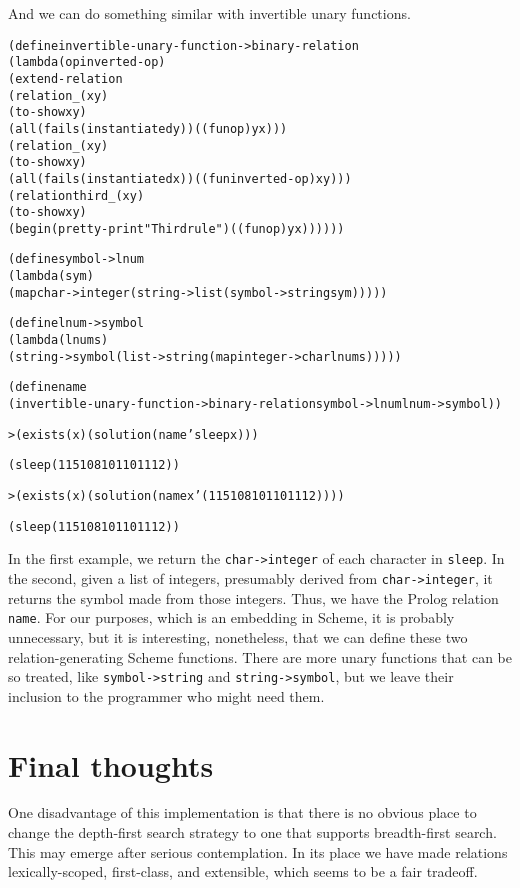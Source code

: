 And we can do something similar with invertible unary functions.
\begin{alltt}
(define invertible-unary-function->binary-relation
  (lambda (op inverted-op)
    (extend-relation
      (relation _ (x y)
        (to-show x y)
        (all (fails (instantiated y)) ((fun op) y x)))
      (relation _ (x y)
        (to-show x y)
        (all (fails (instantiated x)) ((fun inverted-op) x y)))
      (relation third _ (x y)
        (to-show x y)
        (begin (pretty-print "Third rule") ((fun op) y x))))))
\end{alltt}

\begin{alltt}
(define symbol->lnum
  (lambda (sym)
    (map char->integer (string->list (symbol->string sym)))))

(define lnum->symbol
  (lambda (lnums)
    (string->symbol (list->string (map integer->char lnums)))))

(define name
  (invertible-unary-function->binary-relation symbol->lnum lnum->symbol))
\end{alltt}
\begin{alltt}
> (exists (x) (solution (name 'sleep x)))

(sleep (115 108 101 101 112))

> (exists (x) (solution (name x '(115 108 101 101 112))))

(sleep (115 108 101 101 112))
\end{alltt}

In the first example, we return the \texttt{char->integer} of each
character in \texttt{sleep}.  In the second, given a list of integers,
presumably derived from \texttt{char->integer}, it returns the symbol
made from those integers.  Thus, we have the Prolog relation
\texttt{name}.  For our purposes, which is an embedding in Scheme, it
is probably unnecessary, but it is interesting, nonetheless, that we
can define these two relation-generating Scheme functions.  There are
more unary functions that can be so treated, like
\texttt{symbol->string} and \texttt{string->symbol}, but we leave
their inclusion to the programmer who might need them.

\section{Final thoughts}

One disadvantage of this implementation is that there is no obvious
place to change the depth-first search strategy to one that supports
breadth-first search.  This may emerge after serious contemplation.
In its place we have made relations lexically-scoped, first-class, and
extensible, which seems to be a fair tradeoff.  

